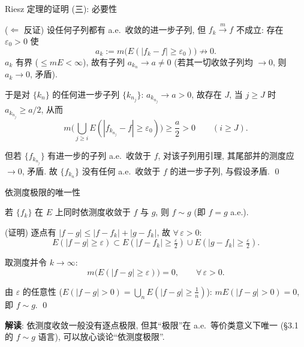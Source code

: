 \begin{frame}{Riesz 定理的证明 (三): 必要性}

\startproof[bg=yellow, fg=red]($\Longleftarrow$ 反证)
设任何子列都有 a.e.\ 收敛的进一步子列, 但 $f_k \xrightarrow{m} f$ 不成立: 存在 $\varepsilon_0 > 0$ 使
\[
a_k := m\big(E(|f_k - f| \geqslant \varepsilon_0)\big) \not\to 0 .
\]
$a_k$ 有界 ($\leqslant mE < \infty$), 故有子列 $a_{k_n} \to a \neq 0$ (若其一切收敛子列均 $\to 0$, 则 $a_k \to 0$, 矛盾).

\pause

于是对 $\{k_n\}$ 的\alert{任何}进一步子列 $\{k_{n_j}\}$: $a_{k_{n_j}} \to a > 0$, 故存在 $J$, 当 $j \geqslant J$ 时 $a_{k_{n_j}} \geqslant a/2$, 从而
\[
m\Big(\bigcup_{j \geqslant i} E(|f_{k_{n_j}} - f| \geqslant \varepsilon_0)\Big)
\geqslant \frac{a}{2} > 0 \qquad (i \geqslant J).
\]

\pause

但若 $\{f_{k_{n_j}}\}$ 有进一步的子列 a.e.\ 收敛于 $f$, 对该子列用\alert{引理}, 其尾部并的测度应 $\to 0$, 矛盾. 故 $\{f_{k_n}\}$ 没有任何 a.e.\ 收敛于 $f$ 的进一步子列, 与假设矛盾.
\qed

\end{frame}



\begin{frame}{依测度极限的唯一性}

\begin{thm}[唯一性]
若 $\{f_k\}$ 在 $E$ 上同时依测度收敛于 $f$ 与 $g$, 则 $f \sim g$ (即 $f = g$ a.e.).
\end{thm}

\startproof[bg=yellow, fg=red](证明)
逐点有 $|f - g| \leqslant |f - f_k| + |g - f_k|$, 故 $\forall\, \varepsilon > 0$:
\[
E(|f - g| \geqslant \varepsilon)
\subset E(|f - f_k| \geqslant \tfrac{\varepsilon}{2})
\cup E(|g - f_k| \geqslant \tfrac{\varepsilon}{2}).
\]

\pause

取测度并令 $k \to \infty$:
\[
m\big(E(|f - g| \geqslant \varepsilon)\big) = 0, \qquad \forall\, \varepsilon > 0.
\]

\pause

由 $\varepsilon$ 的任意性 ($E(|f-g| > 0) = \bigcup_{n} E(|f - g| \geqslant \frac1n)$):
$mE(|f - g| > 0) = 0$, 即 $f \sim g$.
\qed

\pause

\textbf{解读}: 依测度收敛一般没有逐点极限, 但其``极限''在 \alert{a.e.\ 等价类}意义下唯一 (\S 3.1 的 $f \sim g$ 语言), 可以放心谈论``依测度极限''.

\end{frame}

